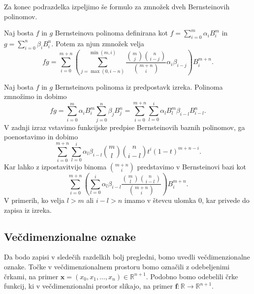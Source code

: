 \documentclass[isrm2, tisk]{fmfdelo}
\newcommand{\R}{\mathbb R}
\begin{document}
    Za konec podrazdelka izpeljimo še formulo za zmnožek dveh Bernsteinovih polinomov.
    \begin{izrek}
        \label{izrek:bernstein-multiplication}
        Naj bosta $f$ in $g$ Bernsteinova polinoma definirana kot $f=\sum_{i=0}^{m}\alpha_iB_i^m$ in $g=\sum_{i=0}^{n}\beta_iB_i^n$.
        Potem za njun zmnožek velja
        \[ fg = \sum_{i=0}^{m+n}\left(\sum_{j=\max(0,i-n)}^{\min(m,i)} \frac{\binom{m}{j}\binom{n}{i-j}}{\binom{m+n}{i}} \alpha_i\beta_{i-j} \right)B_{i}^{m+n}.\]
    \end{izrek}
    \begin{dokaz}
        Naj bosta $f$ in $g$ Bernsteinova polinoma iz predpostavk izreka.
        Polinoma zmnožimo in dobimo
        \[fg =\sum_{i=0}^{m}\alpha_iB_{i}^{m}\sum_{j=0}^{n}\beta_jB_{j}^{n} = \sum_{i=0}^{m+n}\sum_{l=0}^i \alpha_lB_{l}^{m}\beta_{i-l}B_{i-l}^{n}. \]
        V zadnji izraz vstavimo funkcijske predpise Bernsteinovih baznih polinomov, ga poenostavimo in dobimo
        \[\sum_{i=0}^{m+n}\sum_{l=0}^i \alpha_l \beta_{i-l} \binom{m}{l}\binom{n}{i-l}t^{i}(1-t)^{m+n-i}.\]
        Kar lahko z izpostavitvijo binoma $\binom{m+n}{i}$ predstavimo v Bernsteinovi bazi kot
        \[\sum_{i=0}^{m+n} \left(\sum_{l=0}^i  \alpha_l \beta_{i-l}\frac{\binom{m}{l}\binom{n}{i-l}}{\binom{m+n}{i}}\right) B_{i}^{m+n}.\]
        V primerih, ko velja $l>m$ ali $i-l>n$ imamo v števcu ulomka $0$, kar privede do zapisa iz izreka.
    \end{dokaz}

    \subsection{Večdimenzionalne oznake}
    Da bodo zapisi v sledečih razdelkih bolj pregledni, bomo uvedli večdimenzionalne oznake.
    Točke v večdimenzionalnem prostoru bomo označili z odebeljenimi črkami, na primer $\mathbf{x}=(x_0,x_1,\dots,x_n)\in\R^{n+1}$.
    Podobno bomo odebelili črke funkcij, ki v večdimenzionalni prostor slikajo, na primer $\mathbf{f}:\R\to\R^{n+1}$.
\end{document}
